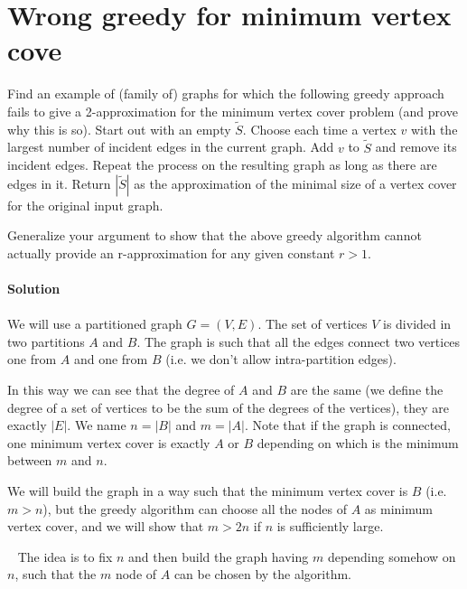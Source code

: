 \documentclass[a4paper]{article}
\begin{document}
\section*{Wrong greedy for minimum vertex cove}
Find an example of (family of) graphs for which the following greedy approach fails to give a 2-approximation for the minimum vertex cover problem (and prove why this is so). 
Start out with an empty $\tilde{S}$.
Choose each time a vertex $v$ with the largest number of incident edges in the current graph.
Add $v$ to $\tilde{S}$ and remove its incident edges.
Repeat the process on the resulting graph as long as there are edges in it.
Return $|\tilde{S}|$ as the approximation of the minimal size of a vertex cover for the original input graph.

Generalize your argument to show that the above greedy algorithm cannot actually provide an r-approximation for any given constant $r > 1$.
\\
\\
\textbf{Solution}
\\
\\
We will use a partitioned graph $G = (V, E)$.
The set of vertices $V$ is divided in two partitions $A$ and $B$.
The graph is such that all the edges connect two vertices one from $A$ and one from $B$ (i.e. we don't allow intra-partition edges).

In this way we can see that the degree of $A$ and $B$ are the same (we define the degree of a set of vertices to be the sum of the degrees of the vertices), they are exactly $|E|$.
We name $n = |B|$ and $m = |A|$.
Note that if the graph is connected, one minimum vertex cover is exactly $A$ or $B$ depending on which is the minimum between $m$ and $n$.

We will build the graph in a way such that the minimum vertex cover is $B$ (i.e. $m > n$), but the greedy algorithm can choose all the nodes of $A$ as minimum vertex cover, and we will show that $m > 2n$ if $n$ is sufficiently large.

\
%
%
The idea is to fix $n$ and then build the graph having $m$ depending somehow on $n$, such that the $m$ node of $A$ can be chosen by the algorithm. 
\end{document}
